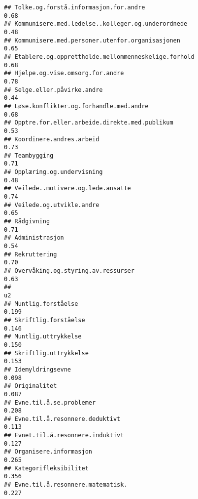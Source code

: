 \documentclass[
]{article}
\begin{document}
\begin{verbatim}
## Tolke.og.forstå.informasjon.for.andre                                            0.68
## Kommunisere.med.ledelse..kolleger.og.underordnede                                0.48
## Kommunisere.med.personer.utenfor.organisasjonen                                  0.65
## Etablere.og.opprettholde.mellommenneskelige.forhold                              0.68
## Hjelpe.og.vise.omsorg.for.andre                                                  0.78
## Selge.eller.påvirke.andre                                                        0.44
## Løse.konflikter.og.forhandle.med.andre                                           0.68
## Opptre.for.eller.arbeide.direkte.med.publikum                                    0.53
## Koordinere.andres.arbeid                                                         0.73
## Teambygging                                                                      0.71
## Opplæring.og.undervisning                                                        0.48
## Veilede..motivere.og.lede.ansatte                                                0.74
## Veilede.og.utvikle.andre                                                         0.65
## Rådgivning                                                                       0.71
## Administrasjon                                                                   0.54
## Rekruttering                                                                     0.70
## Overvåking.og.styring.av.ressurser                                               0.63
##                                                                                     u2
## Muntlig.forståelse                                                               0.199
## Skriftlig.forståelse                                                             0.146
## Muntlig.uttrykkelse                                                              0.150
## Skriftlig.uttrykkelse                                                            0.153
## Idemyldringsevne                                                                 0.098
## Originalitet                                                                     0.087
## Evne.til.å.se.problemer                                                          0.208
## Evne.til.å.resonnere.deduktivt                                                   0.113
## Evnet.til.å.resonnere.induktivt                                                  0.127
## Organisere.informasjon                                                           0.265
## Kategorifleksibilitet                                                            0.356
## Evne.til.å.resonnere.matematisk.                                                 0.227

\end{verbatim}
\end{document}
